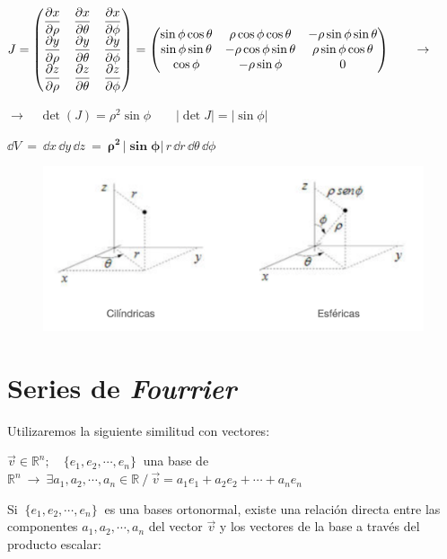 \begin{itemize}
\begin{itemize}
	$J= \mqty(
	\displaystyle \pdv{x}{\rho} & \displaystyle \pdv{x}{\theta} & \displaystyle \pdv{x}{\phi} \\ 
	\displaystyle \pdv{y}{\rho} & \displaystyle \pdv{y}{\theta} & \displaystyle \pdv{y}{\phi} \\ 
	\displaystyle \pdv{z}{\rho} & \displaystyle \pdv{z}{\theta} & \displaystyle \pdv{z}{\phi} \\ 
	)= \mqty( 
	\sin \phi \cos \theta & \rho \cos \phi \cos \theta & -\rho \sin \phi \sin \theta \\
	\sin \phi \sin \theta & -\rho \cos \phi \sin \theta & \rho \sin \phi \cos \theta \\
	\cos \phi & -\rho \sin \phi & 0 
	 ) \qquad \to $
	 
	 $\to \quad \det(J)=\rho^2 \sin \phi \qquad |\det J|=|\sin \phi|$ 
	
	\hspace{5cm} $\dd V \ = \  \dd x \, \dd y\, \dd z \ = \  \boldsymbol{ \rho^2  \, |\sin \phi|} \,  r \, \dd r \, \dd \theta \, \dd \phi$
	\end{itemize}
\end{itemize}


\begin{figure}[H]
	\centering
	\includegraphics[width=.75\textwidth]{imagenes/apendices-01-11.png}
\end{figure}



\chapter{Series de 	\emph{Fourrier}}
\label{ap-SF}

Utilizaremos la siguiente similitud con vectores:

$\vec v \in \mathbb R^n; \quad \{ e_1,e_2,\cdots , e_n \} \ $ una base de $\mathbb R^n \ \to \ \exists a_1,a_2,\cdots ,a_n \in \mathbb R \ / \ \vec v= a_1e_1+a_2e_2+ \cdots + a_ne_n$

Si $\ \{ e_1,e_2,\cdots , e_n \} \ $ es una bases ortonormal, existe una relación directa entre las componentes $ a_1,a_2,\cdots ,a_n$ del vector $\vec v$ y los vectores de la base a través del producto escalar:

